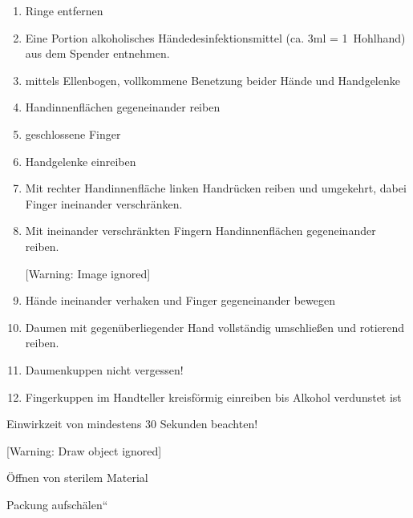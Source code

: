 \documentclass{article}
\begin{document}
\begin{enumerate}
\item Ringe entfernen 

\item Eine Portion alkoholisches H\"andedesinfektionsmittel (ca. 3ml =
1~Hohlhand) aus dem Spen\-der entnehmen. 

\item mittels Ellenbogen, vollkommene Benetzung beider H\"ande und
Handgelenke 

\item Handinnenfl\"achen gegeneinander reiben

\item geschlossene Finger 

\item Handgelenke einreiben

\item Mit rechter Handinnenfl\"ache linken Handr\"ucken reiben und
umgekehrt, dabei Finger ineinander verschr\"anken.

\item Mit ineinander verschr\"ankten Fingern Handinnenfl\"achen
gegeneinander reiben. 

\begin{center}
 [Warning: Image ignored] %

\end{center}
\item H\"ande ineinander verhaken und Finger gegeneinander bewegen

\item Daumen mit gegen\"uberliegender Hand vollst\"andig umschlie{\ss}en
und rotierend reiben. 

\item Daumenkuppen nicht vergessen!

\item Fingerkuppen im Handteller kreisf\"ormig einreiben bis Alkohol
verdunstet ist

\end{enumerate}
{\mdseries
 Einwirkzeit von mindestens 30 Sekunden beachten! }

[Warning: Draw object ignored]

{\mdseries\color[rgb]{0.0,0.0,0.5019608}
\"Offnen von sterilem Material}

{\mdseries
Packung {\quotedblbase}aufsch\"alen{\textquotedblleft} }

{%
 }
\end{document}
